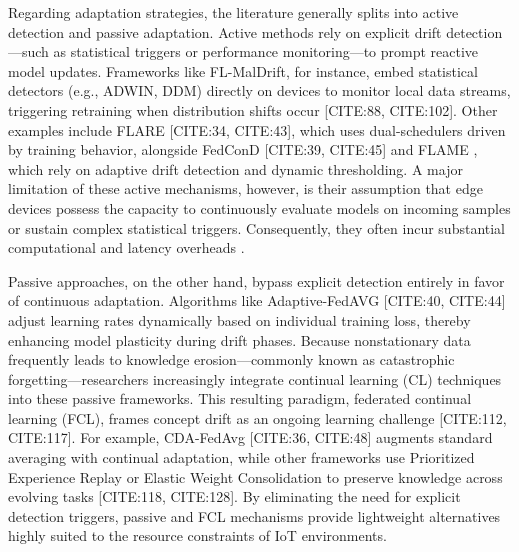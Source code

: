 \documentclass[journal]{IEEEtran}
\begin{document}
Regarding adaptation strategies, the literature generally splits into active detection and passive adaptation. Active methods rely on explicit drift detection—such as statistical triggers or performance monitoring—to prompt reactive model updates. Frameworks like FL-MalDrift, for instance, embed statistical detectors (e.g., ADWIN, DDM) directly on devices to monitor local data streams, triggering retraining when distribution shifts occur [CITE:88, CITE:102]. Other examples include FLARE [CITE:34, CITE:43], which uses dual-schedulers driven by training behavior, alongside FedConD [CITE:39, CITE:45] and FLAME \cite{Mavromatis2024}, which rely on adaptive drift detection and dynamic thresholding. A major limitation of these active mechanisms, however, is their assumption that edge devices possess the capacity to continuously evaluate models on incoming samples or sustain complex statistical triggers. Consequently, they often incur substantial computational and latency overheads \cite{ren2025}.

Passive approaches, on the other hand, bypass explicit detection entirely in favor of continuous adaptation. Algorithms like Adaptive-FedAVG [CITE:40, CITE:44] adjust learning rates dynamically based on individual training loss, thereby enhancing model plasticity during drift phases. Because nonstationary data frequently leads to knowledge erosion—commonly known as catastrophic forgetting—researchers increasingly integrate continual learning (CL) techniques into these passive frameworks. This resulting paradigm, federated continual learning (FCL), frames concept drift as an ongoing learning challenge [CITE:112, CITE:117]. For example, CDA-FedAvg [CITE:36, CITE:48] augments standard averaging with continual adaptation, while other frameworks use Prioritized Experience Replay or Elastic Weight Consolidation to preserve knowledge across evolving tasks [CITE:118, CITE:128]. By eliminating the need for explicit detection triggers, passive and FCL mechanisms provide lightweight alternatives highly suited to the resource constraints of IoT environments.
\end{document}
